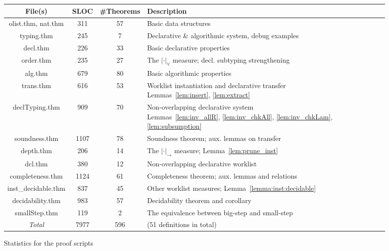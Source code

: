 \begin{figure}[ht]
\centering\begin{tabular}{|c|c|c|l|}\hline
    File(s) & SLOC & \#Theorems & Description\\\hline
    olist.thm, nat.thm  &  311 & 57  & Basic data structures\\\hline
    typing.thm          &  245 & 7   & Declarative \& algorithmic system, debug examples\\\hline
    decl.thm            &  226 & 33  & Basic declarative properties\\\hline
    order.thm           &  235 & 27  & The $|\cdot|_\forall$ measure; decl. subtyping strengthening\\\hline
    alg.thm             &  679 & 80  & Basic algorithmic properties\\\hline
    trans.thm           &  616 & 53  & \makecell[l]{Worklist instantiation and declarative transfer\\
                            Lemmas~\ref{lem:insert}, \ref{lem:extract}}\\\hline
    declTyping.thm      &  909 & 70  & \makecell[l]{Non-overlapping declarative system \\
                            Lemmas~\ref{lem:inv_allR}, \ref{lem:inv_chkAll},
                                \ref{lem:inv_chkLam}, \ref{lem:subsumption}}\\\hline
    soundness.thm       & 1107 & 78  & Soundness theorem; aux. lemmas on transfer\\\hline
    depth.thm           &  206 & 14  & The $|\cdot|_\to$ measure; Lemma~\ref{lem:prune_inst}\\\hline
    dcl.thm             &  380 & 12  & Non-overlapping declarative worklist \\\hline
    completeness.thm    & 1124 & 61  &
                            Completeness theorem; aux. lemmas and relations\\\hline
    inst\_decidable.thm &  837 & 45  & Other worklist measures; Lemma~\ref{lemma:inst:decidable}\\\hline
    decidability.thm    &  983 & 57  & Decidability theorem and corollary\\\hline
    smallStep.thm       &  119 &  2  & The equivalence between big-step and small-step\\\hline
    \hline\emph{Total}               & 7977 & 596 & (51 definitions in total)\\\hline
\end{tabular}
\caption{Statistics for the proof scripts}
\label{fig:proof_statistics}
\end{figure}
